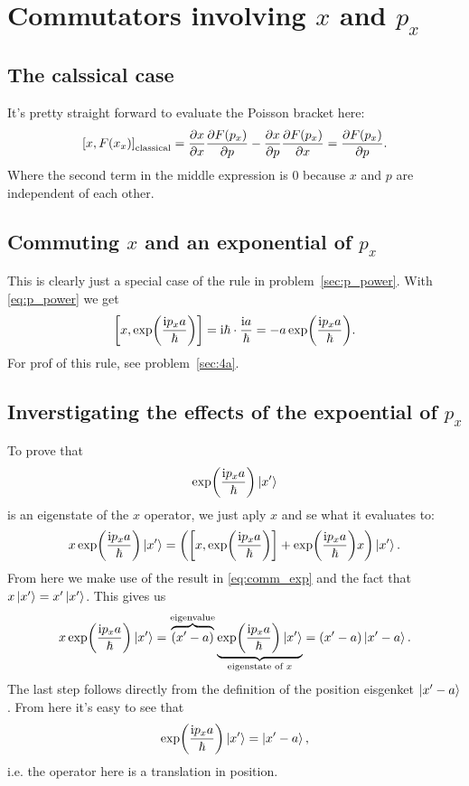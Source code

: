 \documentclass[11pt,letter, swedish, english
]{article}
\begin{document}
\section{Commutators involving $x$ and $p_x$}

\subsection{The calssical case}
It's pretty straight forward to evaluate the Poisson bracket here:
\begin{equation}
\comm{x}{F(x_x)}_\text{classical} 
= \pdv{x}{x}\pdv{F(p_x)}{p} - \pdv{x}{p}\pdv{F(p_x)}{x} 
= \pdv{F(p_x)}{p}.
\end{equation}
Where the second term in the middle expression is 0 because $x$ and
$p$ are independent of each other.

\subsection{Commuting $x$ and an exponential of $p_x$}
This is clearly just a special case of the rule in
problem~\ref{sec:p_power}. With \eqref{eq:p_power} we get
\begin{equation} \label{eq:comm_exp}
\comm{x}{\exp(\frac{\ii p_xa}{\hbar})} 
= \ii\hbar \cdot \frac{\ii a}{\hbar} = -a \exp(\frac{\ii p_xa}{\hbar}).
\end{equation}
For prof of this rule, see problem~\ref{sec:4a}.

\subsection{Inverstigating the effects of the expoential of $p_x$}\label{sec:3c}
To prove that
\begin{equation}
\exp(\frac{\mathrm{i} p_xa}{\hbar})\ket{x'}
\end{equation}
is an eigenstate of the $x$ operator, we just aply $x$ and se what it
evaluates to:
\begin{equation}
x\exp(\frac{\ii p_xa}{\hbar})\ket{x'} 
= \left( \comm{x}{\exp(\frac{\ii p_xa}{\hbar})} 
+\exp(\frac{\ii p_xa}{\hbar}) x \right)\ket{x'}.
\end{equation}
From here we make use of the result in \eqref{eq:comm_exp} and the
fact that $x\ket{x'}=x'\ket{x'}$. This gives us
\begin{equation}\label{eq:3_exp_p}
x\exp(\frac{\mathrm{i} p_xa}{\hbar})\ket{x'} 
= \overbrace{(x'-a)}^\text{eigenvalue}
  \underbrace{\exp(\frac{\mathrm{i} p_xa}{\hbar})\ket{x'}}_\text{eigenstate of $x$}
= (x'-a)\ket{x'-a}.
\end{equation}
The last step follows directly from the definition of the position
eisgenket $\ket{x'-a}$. From here it's easy to see that
\begin{equation}
\exp(\frac{\mathrm{i} p_xa}{\hbar})\ket{x'} = \ket{x'-a},
\end{equation}
i.e. the operator here is a translation in position.
\end{document}
